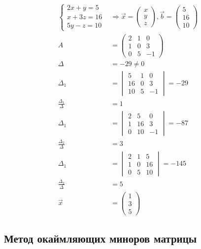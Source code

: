 \documentclass{article}
\begin{document}
\begin{align*}
	\begin{cases}
		2x + y = 5 \\
		x + 3z = 16 \\
		5y - z = 10
	\end{cases}
	&\Rightarrow
	\vec{x} = \begin{pmatrix}x \\ y \\ z\end{pmatrix},
	\vec{b} = \begin{pmatrix}5 \\ 16 \\ 10\end{pmatrix} \\
	A &= \begin{pmatrix}
		2 & 1 & 0 \\
		1 & 0 & 3 \\
		0 & 5 & -1
	\end{pmatrix} \\
	\Delta &= -29 \ne 0 \\
	\Delta_1 &= \begin{vmatrix}
		5 & 1 & 0 \\
		16 & 0 & 3 \\
		10 & 5 & -1
	\end{vmatrix} = -29 \\
	\frac{\Delta_1}{\Delta} &= 1 \\
	\Delta_1 &= \begin{vmatrix}
		2 & 5 & 0 \\
		1 & 16 & 3 \\
		0 & 10 & -1
	\end{vmatrix} = -87 \\
	\frac{\Delta_2}{\Delta} &= 3 \\
	\Delta_1 &= \begin{vmatrix}
		2 & 1 & 5 \\
		1 & 0 & 16 \\
		0 & 5 & 10
	\end{vmatrix} = -145 \\
	\frac{\Delta_2}{\Delta} &= 5 \\
	\vec{x} &= \begin{pmatrix}1 \\ 3 \\ 5\end{pmatrix}
\end{align*}

\subsection{Метод окаймляющих миноров матрицы}
\end{document}
